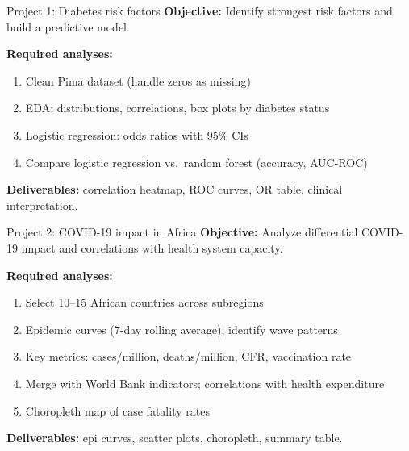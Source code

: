 \documentclass[aspectratio=169,11pt]{beamer}
\begin{document}
\begin{frame}{Project 1: Diabetes risk factors}
\textbf{Objective:} Identify strongest risk factors and build a predictive model.

\vspace{4pt}
\textbf{Required analyses:}
\begin{enumerate}
  \item Clean Pima dataset (handle zeros as missing)
  \item EDA: distributions, correlations, box plots by diabetes status
  \item Logistic regression: odds ratios with 95\% CIs
  \item Compare logistic regression vs.\ random forest (accuracy, AUC-ROC)
\end{enumerate}

\textbf{Deliverables:} correlation heatmap, ROC curves, OR table, clinical interpretation.
\end{frame}

\begin{frame}{Project 2: COVID-19 impact in Africa}
\textbf{Objective:} Analyze differential COVID-19 impact and correlations with health system capacity.

\vspace{4pt}
\textbf{Required analyses:}
\begin{enumerate}
  \item Select 10--15 African countries across subregions
  \item Epidemic curves (7-day rolling average), identify wave patterns
  \item Key metrics: cases/million, deaths/million, CFR, vaccination rate
  \item Merge with World Bank indicators; correlations with health expenditure
  \item Choropleth map of case fatality rates
\end{enumerate}

\textbf{Deliverables:} epi curves, scatter plots, choropleth, summary table.
\end{frame}
\end{document}
